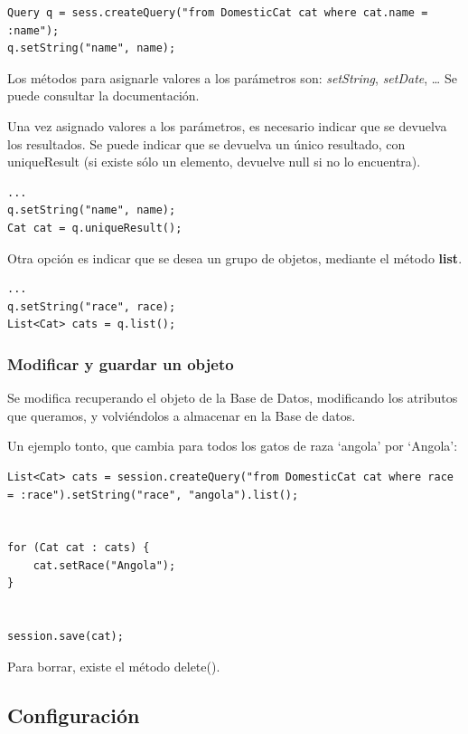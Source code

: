 \documentclass[11pt]{article}
\begin{document}
\begin{lstlisting}
Query q = sess.createQuery("from DomesticCat cat where cat.name = :name");
q.setString("name", name);
\end{lstlisting}


Los métodos para asignarle valores a los parámetros son: \emph{setString}, \emph{setDate}, \ldots{} Se puede consultar la documentación.


Una vez asignado valores a los parámetros, es necesario indicar que se devuelva los resultados. Se puede indicar que se
devuelva un único resultado, con uniqueResult (si existe sólo un elemento, devuelve null si no lo encuentra).


\begin{lstlisting}
...
q.setString("name", name);
Cat cat = q.uniqueResult();
\end{lstlisting}


Otra opción es indicar que se desea un grupo de objetos, mediante el método \textbf{list}. 


\begin{lstlisting}
...
q.setString("race", race);
List<Cat> cats = q.list();
\end{lstlisting}
\subsubsection{Modificar y guardar un objeto}
\label{sec-6-3-2}




Se modifica recuperando el objeto de la Base de Datos, modificando los atributos que queramos, y volviéndolos a almacenar
en la Base de datos. 


Un ejemplo tonto, que cambia para todos los gatos de raza `angola' por `Angola':


\begin{lstlisting}
List<Cat> cats = session.createQuery("from DomesticCat cat where race = :race").setString("race", "angola").list();


for (Cat cat : cats) {
    cat.setRace("Angola");
}


session.save(cat);
\end{lstlisting}
  
Para borrar, existe el método delete(). 
\subsection{Configuración}
\label{sec-6-4}
\label{cfgorm}
\end{document}
